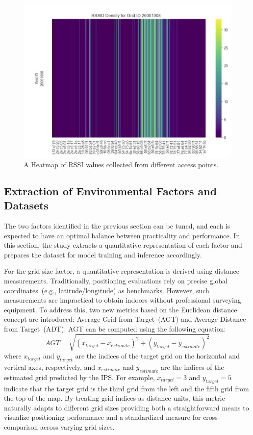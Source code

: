 \documentclass[runningheads]{llncs}
\begin{document}
\begin{figure}[th!]
        \centering
        \includegraphics[width=0.7\linewidth]{figures/meth3.jpg}
        \caption{A Heatmap of RSSI values collected from different access points.}
        \label{fig:heatmap}
\end{figure}

\subsection{Extraction of Environmental Factors and Datasets}\label{ssec:extraction}

The two factors identified in the previous section can be tuned, and each is expected to have an optimal balance between practicality and performance. In this section, the study extracts a quantitative representation of each factor and prepares the dataset for model training and inference accordingly.

For the grid size factor, a quantitative representation is derived using distance measurements. Traditionally, positioning evaluations rely on precise global coordinates~(e.g., latitude/longitude) as benchmarks. However, such measurements are impractical to obtain indoors without professional surveying equipment. To address this,  two new metrics based on the Euclidean distance concept are introduced: Average Grid from Target~(AGT) and Average Distance from Target~(ADT). AGT can be computed using the following equation:
\begin{equation}
        AGT = \sqrt{(x_{target} - x_{estimate})^2 + (y_{target} - y_{estimate})^2}
        \label{eq:agt}
\end{equation}
where $x_{target}$ and $y_{target}$ are the indices of the target grid on the horizontal and vertical axes, respectively, and $x_{estimate}$ and $y_{estimate}$ are the indices of the estimated grid predicted by the IPS. For example, $x_{target} = 3$ and $y_{target} = 5$ indicate that the target grid is the third grid from the left and the fifth grid from the top of the map. By treating grid indices as distance units, this metric naturally adapts to different grid sizes providing both a straightforward means to visualize positioning performance and a standardized measure for cross-comparison across varying grid sizes. 
\end{document}
